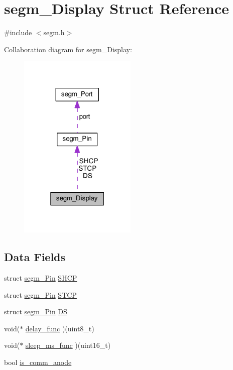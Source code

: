 \hypertarget{structsegm___display}{}\section{segm\+\_\+\+Display Struct Reference}
\label{structsegm___display}


{\ttfamily \#include $<$segm.\+h$>$}



Collaboration diagram for segm\+\_\+\+Display\+:\nopagebreak
\begin{figure}[H]
\begin{center}
\leavevmode
\includegraphics[width=159pt]{structsegm___display__coll__graph}
\end{center}
\end{figure}
\subsection*{Data Fields}
\begin{DoxyCompactItemize}
\item 
struct \mbox{\hyperlink{structsegm___pin}{segm\+\_\+\+Pin}} \mbox{\hyperlink{structsegm___display_a7b3e4bc4f7fb13a681b70f9b0c2cbd8a}{S\+H\+CP}}
\item 
struct \mbox{\hyperlink{structsegm___pin}{segm\+\_\+\+Pin}} \mbox{\hyperlink{structsegm___display_a1c10ce4082cdb688e731a1fd5246edd8}{S\+T\+CP}}
\item 
struct \mbox{\hyperlink{structsegm___pin}{segm\+\_\+\+Pin}} \mbox{\hyperlink{structsegm___display_a2e86a88116155e0fd4b1d3694a8c631b}{DS}}
\item 
void($\ast$ \mbox{\hyperlink{structsegm___display_a15bf3b125a6ae01573a5a58c3dbde08e}{delay\+\_\+func}} )(uint8\+\_\+t)
\item 
void($\ast$ \mbox{\hyperlink{structsegm___display_a1e5ae2ed36ddc0e39cf9af76158e3a19}{sleep\+\_\+ms\+\_\+func}} )(uint16\+\_\+t)
\item 
bool \mbox{\hyperlink{structsegm___display_ad85dceda4ba3b146e4f20ef8981cd22d}{is\+\_\+comm\+\_\+anode}}
\end{DoxyCompactItemize}


